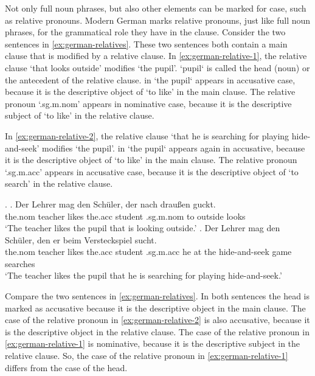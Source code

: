 Not only full noun phrases, but also other elements can be marked for case, such as relative pronouns. Modern German marks relative pronouns, just like full noun phrases, for the grammatical role they have in the clause. Consider the two sentences in \ref{ex:german-relatives}. These two sentences both contain a main clause that is modified by a relative clause.
In \ref{ex:german-relative-1}, the relative clause  `that looks outside' modifies  `the pupil'.  `pupil` is called the head (noun) or the antecedent of the relative clause.  in  `the pupil` appears in accusative case, because it is the descriptive object of  `to like' in the main clause. The relative pronoun  `.\ac{sg}.\ac{m}.\ac{nom}' appears in nominative case, because it is the descriptive subject of  `to like' in the relative clause.

In \ref{ex:german-relative-2}, the relative clause  `that he is searching for playing hide-and-seek' modifies  `the pupil'.  in  `the pupil` appears again in accusative, because it is the descriptive object of  `to like' in the main clause. The relative pronoun  `.\ac{sg}.\ac{m}.\ac{acc}' appears in accusative case, because it is the descriptive object of  `to search' in the relative clause.

\ex.\label{ex:german-relatives}
\ag. Der Lehrer mag den Schüler, der nach draußen guckt.\\
 the.\ac{nom} teacher likes the.\ac{acc} student .\ac{sg}.\ac{m}.\ac{nom} to outside looks\\
 `The teacher likes the pupil that is looking outside.'\label{ex:german-relative-1}
 \bg. Der Lehrer mag den Schüler, den er beim Versteckspiel sucht.\\
 the.\ac{nom} teacher likes the.\ac{acc} student .\ac{sg}.\ac{m}.\ac{acc} he {at the} {hide-and-seek game} searches\\
 `The teacher likes the pupil that he is searching for playing hide-and-seek.'\label{ex:german-relative-2}

Compare the two sentences in \ref{ex:german-relatives}. In both sentences the head is marked as accusative because it is the descriptive object in the main clause. The case of the relative pronoun in \ref{ex:german-relative-2} is also accusative, because it is the descriptive object in the relative clause. The case of the relative pronoun in \ref{ex:german-relative-1} is nominative, because it is the descriptive subject in the relative clause. So, the case of the relative pronoun in \ref{ex:german-relative-1} differs from the case of the head.

